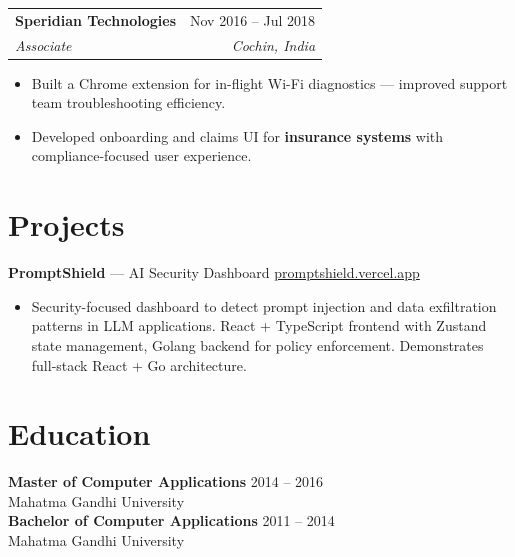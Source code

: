 \documentclass[11pt,a4paper]{article}
\makeatletter
\newcommand{\job}[4]{
\vspace{4pt}
\begin{tabular*}{\textwidth}{l@{\extracolsep{\fill}}r}
\textbf{#1} & #2 \\
\textit{#3} & \textit{#4} \\
\end{tabular*}
\vspace{2pt}
}
\makeatother
\begin{document}
\job
{Speridian Technologies}
{Nov 2016 -- Jul 2018}
{Associate}
{Cochin, India}

\begin{itemize}
\item Built a Chrome extension for in-flight Wi-Fi diagnostics — improved support team troubleshooting efficiency.
\item Developed onboarding and claims UI for \textbf{insurance systems} with compliance-focused user experience.
\end{itemize}

\section*{Projects}

\textbf{PromptShield} — AI Security Dashboard \hfill \href{https://promptshield.vercel.app}{promptshield.vercel.app}

\begin{itemize}
\item Security-focused dashboard to detect prompt injection and data exfiltration patterns in LLM applications. React + TypeScript frontend with Zustand state management, Golang backend for policy enforcement. Demonstrates full-stack React + Go architecture.
\end{itemize}

\section*{Education}

\textbf{Master of Computer Applications} \hfill 2014 -- 2016 \\
Mahatma Gandhi University \\[4pt]
\textbf{Bachelor of Computer Applications} \hfill 2011 -- 2014 \\
Mahatma Gandhi University
\end{document}
